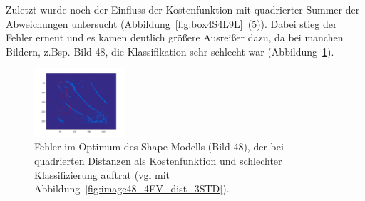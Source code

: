 \documentclass[]{report}
\begin{document}
\begin{enumerate}
\begin{enumerate}
				Zuletzt wurde noch der Einfluss der Kostenfunktion mit quadrierter Summer der Abweichungen untersucht (Abbildung~\ref{fig:box4S4L9L}~(5)). Dabei stieg der Fehler erneut und es kamen deutlich größere Ausreißer dazu, da bei manchen Bildern, z.Bsp. Bild 48, die Klassifikation sehr schlecht war (Abbildung~\ref{fig:image48_4EV_dist2}).
				\begin{figure}
					\centering
					\includegraphics[width=0.3\textwidth]{figures/image48_4EV_dist2.png}
					\caption{Fehler im Optimum des Shape Modells (Bild 48), der bei quadrierten Distanzen als Kostenfunktion und schlechter Klassifizierung auftrat (vgl mit Abbildung~\ref{fig:image48_4EV_dist_3STD}).}					\label{fig:image48_4EV_dist2}									
				\end{figure}
			\end{enumerate}
			
	\end{enumerate}
	
\end{document}
